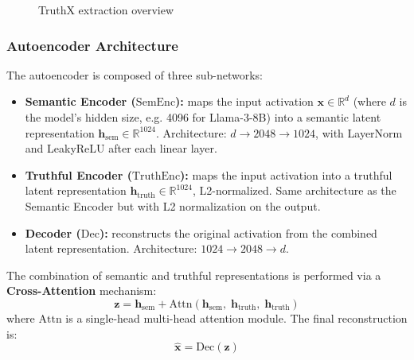 \begin{figure}[t]
{%
}
    \caption{TruthX extraction overview}
    \label{fig:truthx-ext-pipeline}
\end{figure}
\subsubsection{Autoencoder Architecture}

The autoencoder is composed of three sub-networks:

\begin{itemize}
    \item \textbf{Semantic Encoder ($\mathrm{SemEnc}$):} maps the input activation $\mathbf{x} \in \mathbb{R}^{d}$ (where $d$ is the model's hidden size, e.g. 4096 for Llama-3-8B) into a semantic latent representation $\mathbf{h}_{\mathrm{sem}} \in \mathbb{R}^{1024}$. Architecture: $d \to 2048 \to 1024$, with LayerNorm and LeakyReLU after each linear layer.
    \item \textbf{Truthful Encoder ($\mathrm{TruthEnc}$):} maps the input activation into a truthful latent representation $\mathbf{h}_{\mathrm{truth}} \in \mathbb{R}^{1024}$, L2-normalized. Same architecture as the Semantic Encoder but with L2 normalization on the output.
    \item \textbf{Decoder ($\mathrm{Dec}$):} reconstructs the original activation from the combined latent representation. Architecture: $1024 \to 2048 \to d$.
\end{itemize}

The combination of semantic and truthful representations is performed via a \textbf{Cross-Attention} mechanism:
\begin{equation}
\label{eq:cross_attention}
\mathbf{z} = \mathbf{h}_{\mathrm{sem}} + \mathrm{Attn}(\mathbf{h}_{\mathrm{sem}},\; \mathbf{h}_{\mathrm{truth}},\; \mathbf{h}_{\mathrm{truth}})
\end{equation}
where $\mathrm{Attn}$ is a single-head multi-head attention module. The final reconstruction is:
\begin{equation}
\label{eq:decoder_recon}
\hat{\mathbf{x}} = \mathrm{Dec}(\mathbf{z})
\end{equation}


